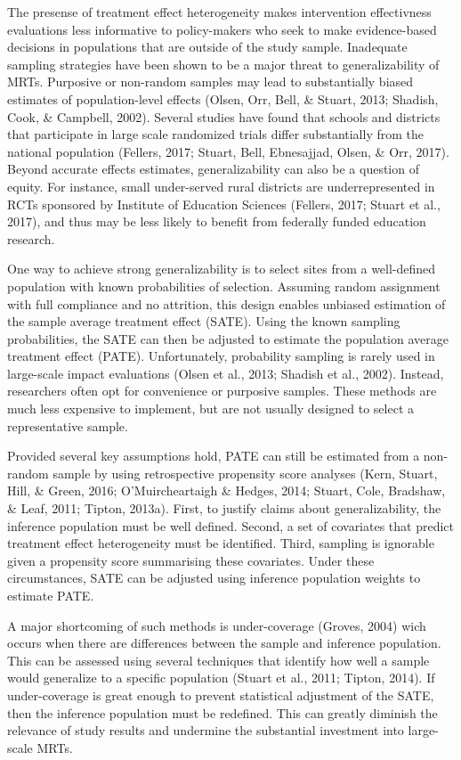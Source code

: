 \documentclass[man,floatsintext]{apa6}
\begin{document}
The presense of treatment effect heterogeneity makes intervention effectivness evaluations less informative to policy-makers who seek to make evidence-based decisions in populations that are outside of the study sample. Inadequate sampling strategies have been shown to be a major threat to generalizability of MRTs. Purposive or non-random samples may lead to substantially biased estimates of population-level effects (Olsen, Orr, Bell, \& Stuart, 2013; Shadish, Cook, \& Campbell, 2002). Several studies have found that schools and districts that participate in large scale randomized trials differ substantially from the national population (Fellers, 2017; Stuart, Bell, Ebnesajjad, Olsen, \& Orr, 2017). Beyond accurate effects estimates, generalizability can also be a question of equity. For instance, small under-served rural districts are underrepresented in RCTs sponsored by Institute of Education Sciences (Fellers, 2017; Stuart et al., 2017), and thus may be less likely to benefit from federally funded education research.

One way to achieve strong generalizability is to select sites from a well-defined population with known probabilities of selection. Assuming random assignment with full compliance and no attrition, this design enables unbiased estimation of the sample average treatment effect (SATE). Using the known sampling probabilities, the SATE can then be adjusted to estimate the population average treatment effect (PATE). Unfortunately, probability sampling is rarely used in large-scale impact evaluations (Olsen et al., 2013; Shadish et al., 2002). Instead, researchers often opt for convenience or purposive samples. These methods are much less expensive to implement, but are not usually designed to select a representative sample.

Provided several key assumptions hold, PATE can still be estimated from a non-random sample by using retrospective propensity score analyses (Kern, Stuart, Hill, \& Green, 2016; O'Muircheartaigh \& Hedges, 2014; Stuart, Cole, Bradshaw, \& Leaf, 2011; Tipton, 2013a). First, to justify claims about generalizability, the inference population must be well defined. Second, a set of covariates that predict treatment effect heterogeneity must be identified. Third, sampling is ignorable given a propensity score summarising these covariates. Under these circumstances, SATE can be adjusted using inference population weights to estimate PATE.

A major shortcoming of such methods is under-coverage (Groves, 2004) wich occurs when there are differences between the sample and inference population. This can be assessed using several techniques that identify how well a sample would generalize to a specific population (Stuart et al., 2011; Tipton, 2014). If under-coverage is great enough to prevent statistical adjustment of the SATE, then the inference population must be redefined. This can greatly diminish the relevance of study results and undermine the substantial investment into large-scale MRTs.
\end{document}
